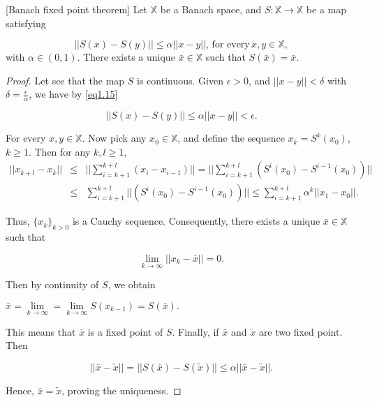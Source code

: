 \begin{theorem}\label{BFT}[Banach fixed point theorem]
	Let $\mathbb{X}$ be a Banach space, and $S: \mathbb{X} \rightarrow \mathbb{X}$ be a map satisfying 
	
	\begin{equation}\label{eq1.15}
	||S(x)-S(y)||\leq \alpha ||x-y||,\,\mbox{for every}\, x,y \in \mathbb{X},
	\end{equation}
with $\alpha \in (0,1)$. There exists a unique $\bar{x} \in \mathbb{X}$ such that $S(\bar{x})=\bar{x}$.
\end{theorem}
\begin{proof}
	Let see that the map $S$ is continuous. Given $\epsilon>0$, and $||x-y||<\delta$ with $\delta=\frac{\epsilon}{\alpha}$, we have by \ref{eq1.15}
	
	$$||S(x)-S(y)||\leq \alpha ||x-y||<\epsilon.$$
	
	For every $x,y \in \mathbb{X}$. Now pick any $x_0 \in \mathbb{X}$, and define the sequence $x_k=S^k(x_0)$, $k\geq 1$. 
Then for any $k,l\geq 1$,
\begin{eqnarray*}
||x_{k+l}-x_{k}||&\leq& ||\sum_{i=k+1}^{k+l}(x_i-x_{i-1})||=||\sum_{i=k+1}^{k+l}(S^i(x_0)-S^{i-1}(x_0))||\\
&\leq& \sum_{i=k+1}^{k+l}||(S^i(x_0)-S^{i-1}(x_0))||\leq \sum_{i=k+1}^{k+l} \alpha^k||x_1-x_0||.
\end{eqnarray*}

Thus, $\{x_k\}_{k>0}$ is a Cauchy sequence. Consequently, there exists a unique $\bar{x} \in \mathbb{X}$ such that 

$$\lim_{k\rightarrow \infty}||x_k-\bar{x}||=0.$$

Then by continuity of $S$, we obtain

\begin{center}
	$\bar{x}=\lim\limits_{k\rightarrow \infty}=\lim\limits_{k \rightarrow \infty} S(x_{k-1})=S(\bar{x}).$
\end{center}

This means that $\bar{x}$ is a fixed point of $S$. Finally, if $\bar{x}$ and $\tilde{x}$ are two fixed point. Then

$$||\bar{x}-\tilde{x}||=||S(\bar{x})-S(\tilde{x})||\leq \alpha ||\bar{x}-\tilde{x}||.$$

Hence, $\bar{x}=\tilde{x}$, proving the uniqueness.	
\end{proof}

